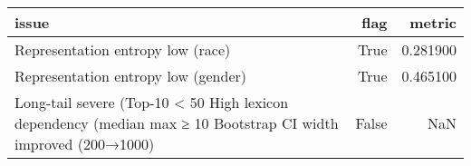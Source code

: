 \begin{tabular}{lrr}
\toprule
issue & flag & metric \\
\midrule
Representation entropy low (race) & True & 0.281900 \\
Representation entropy low (gender) & True & 0.465100 \\
Long-tail severe (Top-10 < 50%
High lexicon dependency (median max ≥ 10%
Bootstrap CI width improved (200→1000) & False & NaN \\
\bottomrule
\end{tabular}
